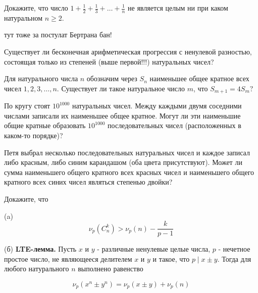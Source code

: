 \newpage

\hspace{3mm}

Докажите, что число $1+\frac{1}{2}+\frac{1}{3}+\ldots+\frac{1}{n}$ не является целым ни при каком натуральном $n \geqslant 2$.


\begin{flushright}
        \scriptsize{тут тоже за постулат Бертрана бан!}
\end{flushright}

Существует ли бесконечная арифметическая прогрессия с ненулевой разностью, состоящая только из степеней (выше первой!!!) натуральных чисел?

Для натурального числа $n$ обозначим через $S_n$ наименьшее общее кратное всех чисел $1,2,3, \ldots, n$. Существует ли такое натуральное число $m$, что $S_{m+1}=4 S_m ?$


По кругу стоят $10^{1000}$ натуральных чисел. Между каждыми двумя соседними числами записали их наименьшее общее кратное. Могут ли эти наименьшие общие кратные образовать $10^{1000}$ последовательных чисел (расположенных в каком-то порядке)?

Петя выбрал несколько последовательных натуральных чисел и каждое записал либо красным, либо синим карандашом (оба цвета присутствуют). Может ли сумма наименьшего общего кратного всех красных чисел и наименьшего общего кратного всех синих чисел являться степенью двойки?

Докажите, что

(a)
$$
\nu_p(C_n^k)>\nu_p(n)-\frac{k}{p-1}
$$

(б)
\textbf{LTE-лемма.} Пусть $x$ и $y$ - различные ненулевые целые числа, $p$ - нечетное простое число, не являющееся делителем $x$ и $y$ и такое, что $p \mid x \pm y$. Тогда для любого натурального $n$ выполнено равенство

$$
\nu_p(x^n \pm y^n) = \nu_p(x \pm y)+\nu_p (n)
$$